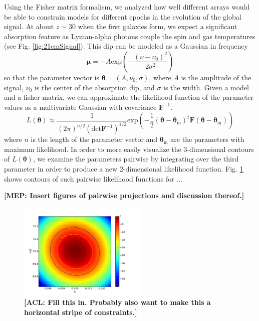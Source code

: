 \documentclass[twolcolumn,apj]{emulateapj}
\newcommand{\F}{\mathbf{F}}
\newcommand{\acl}[1]{{\color{red} \textbf{[ACL:  #1]}}}
\newcommand{\mep}[1]{{\color{applegreen} \textbf{[MEP:  #1]}}}
\begin{document}
Using the Fisher matrix formalism, we analyzed how well different arrays would be able to constrain models for different epochs in the evolution of the global signal. %
At about $z\sim 30$ when the first galaxies form, we expect a significant absorption feature as Lyman-alpha photons couple the spin and gas temperatures (see Fig. \ref{fig:21cmSignal}). This dip can be modeled as a Gaussian in frequency
\begin{equation}
\boldsymbol \mu = -A\textrm{exp}\left ( -\frac{(\nu - \nu_0)^2}{2\sigma^2} \right ) 
\end{equation}
so that the parameter vector is $\boldsymbol \theta = (A,\nu_0,\sigma)$, where $A$ is the amplitude of the signal, $\nu_0$ is the center of the absorption dip, and $\sigma$ is the width. Given a model and a fisher matrix, we can approximate the likelihood function of the parameter values as a multivariate Gaussian with covariance $\F^{-1}$.  
\begin{equation}
L(\boldsymbol \theta) \approx \frac{1}{(2\pi)^{n/2}(\textrm{det} \F^{-1})^{1/2}} \textrm{exp} \left ( -\frac{1}{2}(\boldsymbol \theta - \boldsymbol \theta_{\textrm{m}})^t \F (\boldsymbol \theta - \boldsymbol \theta_{\textrm{m}}) \right )
\end{equation}
where $n$ is the length of the parameter vector and $\boldsymbol \theta_{\textrm{m}}$ are the parameters with maximum likelihood. In order to more easily visualize the 3-dimensional contours of $L(\boldsymbol \theta)$, we examine the parameters pairwise by integrating over the third parameter in order to produce a new 2-dimensional likelihood function. Fig. \ref{fig:contours} shows contours of such pairwise likelihood functions for ... 

\mep{Insert figures of pairwise projections and discussion thereof.} 

\begin{figure}[h]
	\centering
	\includegraphics[width=0.55\textwidth]{figures/contours_A_nu0.pdf}
	\caption{\acl{Fill this in.  Probably also want to make this a horizontal stripe of constraints.}}
	\label{fig:contours}
\end{figure}
\end{document}
